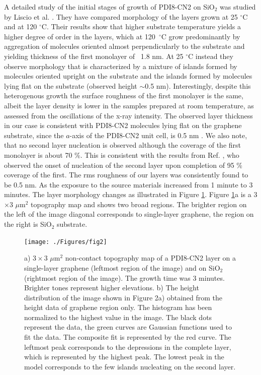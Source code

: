 \documentclass[review]{elsarticle}
\begin{document}
 
A detailed study of the initial stages of growth of PDI8-CN2 on SiO$_{2}$ was studied by Liscio et al.
\cite{liscio-2013}.
 They have compared  morphology of the layers grown at 25 $^\circ$C and at 120 $^\circ$C.
 Their results show that higher substrate temperature yields a  higher degree of order in the layers, which at 120\ $^\circ$C grow predominantly by aggregation of molecules oriented almost perpendicularly to the substrate and yielding thickness of the first monolayer of ~1.8 nm.
 At 25 $^\circ$C instead they observe morphology that is characterized by a mixture of islands formed by molecules oriented upright on the substrate and the islands formed by molecules lying flat on the substrate (observed height $\sim$0.5 nm).
 Interestingly, despite this heterogenous growth the surface roughness of the first monolayer is the same, albeit the layer density is lower in the samples prepared at room temperature, as assessed from the oscillations of the x-ray intensity.
The observed layer thickness in our case is consistent with PDI8-CN2 molecules lying flat on the graphene substrate, since the $a$-axis of the PDI8-CN2 unit cell, is 0.5 nm \cite{liscio-2012}.
We also note, that no second layer nucleation is observed although the coverage of the first monolayer is about 70 \%.
 This is consistent with the results from Ref.
 \cite{liscio-2013}, who observed the onset of nucleation of the second layer upon completion of 95 \% coverage of the first.
 The rms roughness of our layers was consistently found to be 0.5 nm.
 As the exposure to the source materials increased from 1 minute to 3 minutes.
 The layer morphology changes as illustrated in Figure \ref{fig:2}.
 Figure \ref{fig:2}a is a  3$\times$3 $\mu$m$^{2}$ topography map and shows two broad regions.
 The brighter region on the left of the image diagonal corresponds to single-layer graphene, the region on the right is SiO$_{2}$ substrate.
 
\begin{figure}[htb]
  \centering
   \texttt{[image: ./Figures/fig2]}
  \caption{a) $3\times3$ $\mu$m$^{2}$ non-contact topography map of a PDI8-CN2 layer on a single-layer graphene (leftmost region of the image) and on SiO$_{2}$ (rightmost region of the image).
 The growth time was 3 minutes.
 Brighter tones represent higher elevations.
 b) The height distribution of the image shown in Figure 2a) obtained from the height data of graphene region only.
 The histogram has been normalized to the highest value in the image.
 The black dots represent the data, the green curves are Gaussian functions used to fit the data.
 The composite fit is represented by the red curve.
  The leftmost peak corresponds to the depressions in the complete layer, which is represented by the highest peak.
 The lowest peak in the model corresponds to the few islands nucleating on the second layer.
}  \label{fig:2}
\end{figure}
\end{document}
